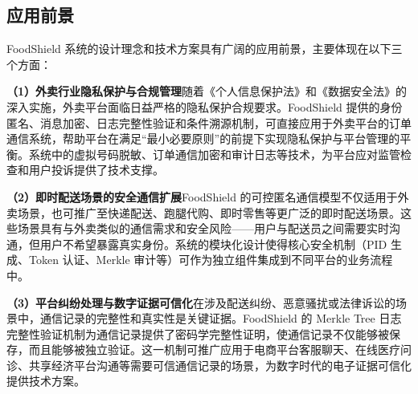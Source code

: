 \subsection{应用前景}

FoodShield 系统的设计理念和技术方案具有广阔的应用前景，主要体现在以下三个方面：

\textbf{（1）外卖行业隐私保护与合规管理}\quad 随着《个人信息保护法》和《数据安全法》的深入实施，外卖平台面临日益严格的隐私保护合规要求。FoodShield 提供的身份匿名、消息加密、日志完整性验证和条件溯源机制，可直接应用于外卖平台的订单通信系统，帮助平台在满足“最小必要原则”的前提下实现隐私保护与平台管理的平衡。系统中的虚拟号码脱敏、订单通信加密和审计日志等技术，为平台应对监管检查和用户投诉提供了技术支撑。

\textbf{（2）即时配送场景的安全通信扩展}\quad FoodShield 的可控匿名通信模型不仅适用于外卖场景，也可推广至快递配送、跑腿代购、即时零售等更广泛的即时配送场景。这些场景具有与外卖类似的通信需求和安全风险——用户与配送员之间需要实时沟通，但用户不希望暴露真实身份。系统的模块化设计使得核心安全机制（PID 生成、Token 认证、Merkle 审计等）可作为独立组件集成到不同平台的业务流程中。

\textbf{（3）平台纠纷处理与数字证据可信化}\quad 在涉及配送纠纷、恶意骚扰或法律诉讼的场景中，通信记录的完整性和真实性是关键证据。FoodShield 的 Merkle Tree 日志完整性验证机制为通信记录提供了密码学完整性证明，使通信记录不仅能够被保存，而且能够被独立验证。这一机制可推广应用于电商平台客服聊天、在线医疗问诊、共享经济平台沟通等需要可信通信记录的场景，为数字时代的电子证据可信化提供技术方案。
